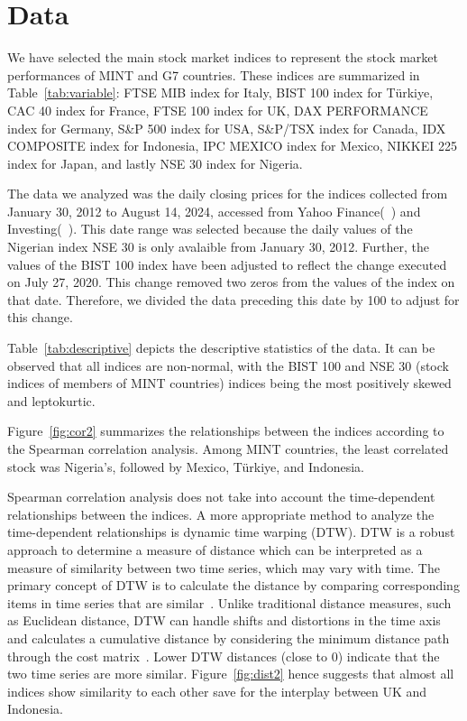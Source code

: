 \section{Data}
\label{sec:data}
%
We have selected the main stock market indices to represent the stock market
performances of MINT and G7 countries. These indices are summarized in 
Table~\ref{tab:variable}: FTSE MIB index for Italy, BIST 100 index for
T\"{u}rkiye, CAC 40 index for France, FTSE 100 index for UK, DAX PERFORMANCE
index for Germany, S\&P 500 index for USA, S\&P/TSX index for Canada, IDX
COMPOSITE index for Indonesia, IPC MEXICO index for Mexico, NIKKEI 225 index for
Japan, and lastly NSE 30 index for Nigeria.  

The data we analyzed was the daily closing prices for the indices collected from
January 30, 2012 to August 14, 2024, accessed from Yahoo
Finance(~\cite{yfinance}) and Investing(~\cite{investing}). 
This date range was selected because the daily values of the Nigerian index NSE
30 is only avalaible from January 30, 2012. Further, the values of the BIST 100
index have been adjusted to reflect the change executed on July 27, 2020. This 
change removed two zeros from the values of the index on that date. Therefore, 
we divided the data preceding this date by 100 to adjust for this change. 

Table~\ref{tab:descriptive} depicts the descriptive statistics of the data. It
can be observed that all indices are non-normal, with the BIST 100 and NSE 30
(stock indices of members of MINT countries) indices being the most positively
skewed and leptokurtic.

Figure~\ref{fig:cor2} summarizes the relationships between the indices according
to the Spearman correlation analysis. Among MINT countries, the least correlated
stock was Nigeria's, followed by Mexico, T\"{u}rkiye, and Indonesia.

Spearman correlation analysis does not take into account the time-dependent 
relationships between the indices. A more appropriate method to analyze the
time-dependent relationships is dynamic time warping (DTW).  DTW is a robust
approach to determine a measure of distance which can be interpreted as a
measure of similarity between two time series, which may vary with time. The
primary concept of DTW is to calculate the distance by comparing corresponding
items in time series that are similar~\citep{dynamic}. Unlike traditional
distance measures, such as Euclidean distance, DTW can handle shifts and
distortions in the time axis and calculates a cumulative distance by considering
the minimum distance path through the cost matrix~\citep{muller2007dynamic}.
Lower DTW distances (close to $0$) indicate that the two time
series are more similar. Figure~\ref{fig:dist2} hence suggests that almost all 
indices show similarity to each other save for the interplay between UK and
Indonesia.

